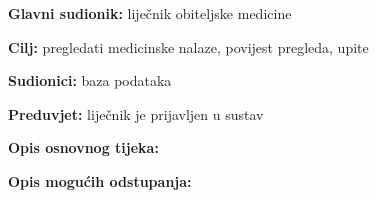                     
                    \noindent {}
					\begin{packed_item}
	
						\item \textbf{Glavni sudionik: }liječnik obiteljske medicine
						\item  \textbf{Cilj:} pregledati medicinske nalaze, povijest pregleda, upite
						\item  \textbf{Sudionici:} baza podataka
						\item  \textbf{Preduvjet:} liječnik je prijavljen u sustav
						\item  \textbf{Opis osnovnog tijeka:}
						
						\item[] \begin{packed_enum}
	
							\item 
							\item 
							\item 

						\end{packed_enum}
						
						\item  \textbf{Opis mogućih odstupanja:}
						
						\item[] \begin{packed_item}
	
							\item[2.a] 
							\item[] \begin{packed_enum}
								
								\item 
								\item 
							\end{packed_enum}
							
						\end{packed_item}
					\end{packed_item}

